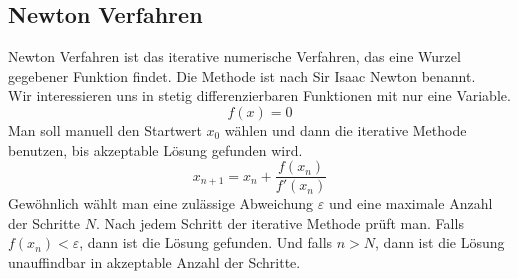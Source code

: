 \documentclass[a4paper,12pt]{llncs}
\numberwithin{equation}{section}
\begin{document}
\subsection{Newton Verfahren}
Newton Verfahren ist das iterative numerische Verfahren, das eine Wurzel gegebener Funktion findet.	Die Methode ist nach Sir Isaac Newton benannt. \\
Wir interessieren uns in stetig differenzierbaren Funktionen mit nur eine Variable.
\[
f(x) = 0
\] 
Man soll manuell den Startwert $x_0$ wählen und dann die iterative Methode benutzen, bis akzeptable Lösung gefunden wird.
\[
x_{n+1} = x_n + \frac{f(x_n)}{f'(x_n)}
\] 
Gewöhnlich wählt man eine zulässige Abweichung $\varepsilon$ und eine maximale Anzahl der Schritte $N$.
Nach jedem Schritt der iterative Methode prüft man. Falls $f(x_n)  < \varepsilon$, dann ist die Lösung gefunden. Und falls $n > N$, dann ist die Lösung unauffindbar in akzeptable Anzahl der Schritte. 
\end{document}
